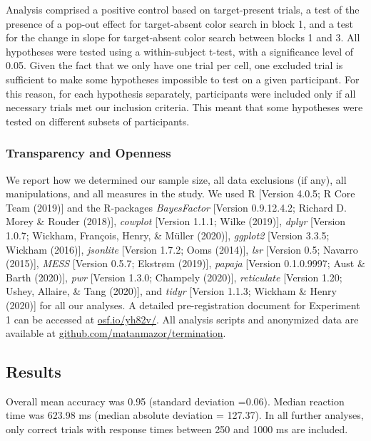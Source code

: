 \documentclass[12pt,twoside]{reedthesis}
\begin{document}
Analysis comprised a positive control based on target-present trials, a test of the presence of a pop-out effect for target-absent color search in block 1, and a test for the change in slope for target-absent color search between blocks 1 and 3. All hypotheses were tested using a within-subject t-test, with a significance level of 0.05.
Given the fact that we only have one trial per cell, one excluded trial is sufficient to make some hypotheses impossible to test on a given participant. For this reason, for each hypothesis separately, participants were included only if all necessary trials met our inclusion criteria. This meant that some hypotheses were tested on different subsets of participants.

\hypertarget{transparency-and-openness}{%
\subsubsection{Transparency and Openness}\label{transparency-and-openness}}

We report how we determined our sample size, all data exclusions (if any), all manipulations, and all measures in the study. We used R {[}Version 4.0.5; R Core Team (2019){]} and the R-packages \emph{BayesFactor} {[}Version 0.9.12.4.2; Richard D. Morey \& Rouder (2018){]}, \emph{cowplot} {[}Version 1.1.1; Wilke (2019){]}, \emph{dplyr} {[}Version 1.0.7; Wickham, François, Henry, \& Müller (2020){]}, \emph{ggplot2} {[}Version 3.3.5; Wickham (2016){]}, \emph{jsonlite} {[}Version 1.7.2; Ooms (2014){]}, \emph{lsr} {[}Version 0.5; Navarro (2015){]}, \emph{MESS} {[}Version 0.5.7; Ekstrøm (2019){]}, \emph{papaja} {[}Version 0.1.0.9997; Aust \& Barth (2020){]}, \emph{pwr} {[}Version 1.3.0; Champely (2020){]}, \emph{reticulate} {[}Version 1.20; Ushey, Allaire, \& Tang (2020){]}, and \emph{tidyr} {[}Version 1.1.3; Wickham \& Henry (2020){]} for all our analyses. A detailed pre-registration document for Experiment 1 can be accessed at \url{osf.io/yh82v/}. All analysis scripts and anonymized data are available at \url{github.com/matanmazor/termination}.

\hypertarget{results}{%
\subsection{Results}\label{results}}

Overall mean accuracy was 0.95 (standard deviation =0.06). Median reaction time was 623.98 ms (median absolute deviation = 127.37). In all further analyses, only correct trials with response times between 250 and 1000 ms are included.
\end{document}
